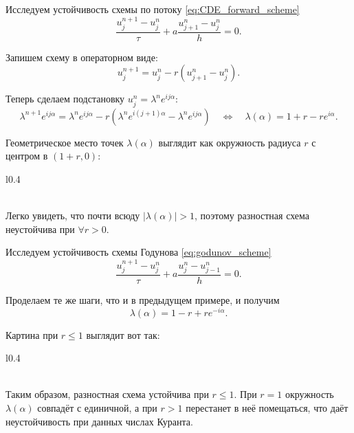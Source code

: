 \documentclass{article}
\begin{document}
\begin{example}
	Исследуем устойчивость схемы по потоку \eqref{eq:CDE_forward_scheme}
	\[\frac{u_j^{n+1}-u_j^n}{\tau}+a\frac{u_{j+1}^n-u_j^n}{h}=0.\]

	Запишем схему в операторном виде:
	\[u_j^{n+1}=u_j^n-r(u_{j+1}^n-u_j^n).\]

	Теперь сделаем подстановку $u_j^n=\lambda^ne^{ij\alpha}$:
	\[\lambda^{n+1}e^{ij\alpha}=\lambda^ne^{ij\alpha}-r(\lambda^n
	e^{i(j+1)\alpha}-\lambda^ne^{ij\alpha})\quad\Leftrightarrow\quad
	\lambda(\alpha)=1+r-re^{i\alpha}.\]

	Геометрическое место точек $\lambda(\alpha)$ выглядит как окружность
	радиуса $r$ с центром в $(1+r,0)$:

	{\makeatletter
	\let\par\@@par
	\par{}
	\everypar{}

	\begin{wrapfigure}{l}{0.4\textwidth}
		
	\end{wrapfigure}

	\leavevmode\\
	Легко увидеть, что почти всюду $|\lambda(\alpha)|>1$, поэтому
	разностная схема неустойчива при $\forall r>0$.
	\par}
\end{example}

\begin{example}
	Исследуем устойчивость схемы Годунова \eqref{eq:godunov_scheme}
	\[\frac{u_j^{n+1}-u_j^n}{\tau}+a\frac{u_j^n-u_{j-1}^n}{h}=0.\]

	Проделаем те же шаги, что и в предыдущем примере, и получим
	\[\lambda(\alpha)=1-r+re^{-i\alpha}.\]

	Картина при $r\le 1$ выглядит вот так:
	{\makeatletter
	\let\par\@@par
	\par{}
	\everypar{}

	\begin{wrapfigure}{l}{0.4\textwidth}
		
	\end{wrapfigure}

	\leavevmode\\
	Таким образом, разностная схема устойчива при $r\le 1$. При $r=1$
	окружность $\lambda(\alpha)$ совпадёт с единичной, а при $r>1$
	перестанет в неё помещаться, что даёт неустойчивость при данных числах
	Куранта.\\\\
	\par}
\end{example}
\end{document}
